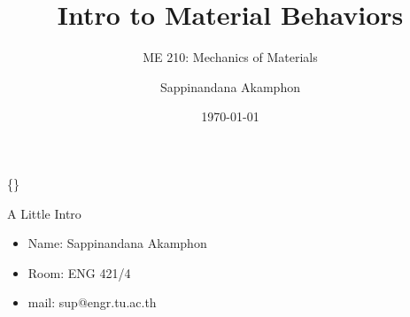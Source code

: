 \documentclass[10pt, svgnames]{beamer}
\author{Sappinandana Akamphon}
\date{\today}
\title{Intro to Material Behaviors}
\subtitle{ME 210: Mechanics of Materials}
\institute{Department of Mechanical Engineering, TSE}
\date{}
\begin{document}
\begin{frame}[label={sec:orgb021edc}]{\{\}}
\maketitle
\end{frame}

\begin{frame}[label={sec:org1caa009}]{A Little Intro}
\begin{itemize}
\item Name: Sappinandana Akamphon

\item Room: ENG 421/4

\item mail: sup@engr.tu.ac.th
\end{itemize}
\end{frame}
\end{document}
